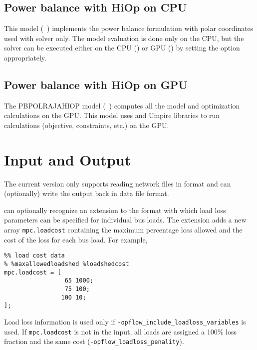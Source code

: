 \begin{comment}
\subsection{Power balance cartesian}
\end{comment}

\subsection{Power balance with HiOp on CPU}
This model ({\opflowmodel~\pbpolhiop}) implements the power balance formulation with polar coordinates used with \hiop solver only. The model evaluation is done only on the CPU, but the \hiop solver can be executed either on the CPU () or GPU () by setting the  option appropriately.

\subsection{Power balance with HiOp on GPU}
The PBPOLRAJAHIOP model ({\opflowmodel~\pbpolrajahiop}) computes all the model and optimization calculations on the GPU. This model uses \raja and Umpire \cite{beckingsale2019umpire} libraries to run \opflow calculations (objective, constraints, etc.) on the GPU. 

\section{Input and Output}
The current \exago version only supports reading network files in \matpower format and can (optionally) write the output back in \matpower data file format.

\exago can optionally recognize an extension to the \matpower format with which load loss parameters can be specified for individual bus loads.  The extension adds a new array \texttt{mpc.loadcost} containing the maximum percentage loss allowed and the cost of the loss for each bus load. For example,
\begin{lstlisting}
%% load cost data
% %maxallowedloadshed %loadshedcost
mpc.loadcost = [
                 65 1000;
                 75 100;
                100 10;
];
\end{lstlisting}
Load loss information is used only if \texttt{-opflow\_include\_loadloss\_variables} is used.  If \texttt{mpc.loadcost} is not in the input, all loads are assigned a 100\% loss fraction and the same cost (\texttt{-opflow\_loadloss\_penality}).


